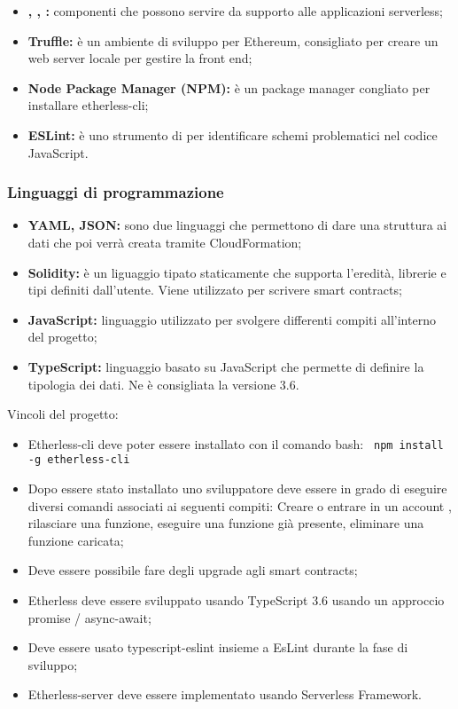 \begin{itemize}
    		 	\item \textbf{, , : }componenti che possono servire da supporto alle applicazioni serverless;
    		 	\item \textbf{Truffle: }è un ambiente di sviluppo per Ethereum, consigliato per creare un web server locale per gestire la front end;
    		 	\item \textbf{Node Package Manager (NPM): }è un package manager congliato per installare etherless-cli;
    			\item \textbf{ESLint: }è uno strumento di  per identificare schemi problematici nel codice JavaScript.
    		 
		\end{itemize}     	
	\subsubsection{Linguaggi di programmazione}
        	\begin{itemize}
        		\item \textbf{YAML, JSON: }sono due linguaggi che permettono di dare una struttura ai dati che poi verrà creata  tramite CloudFormation;
        		\item \textbf{Solidity: }è un liguaggio tipato staticamente che supporta l'eredità, librerie e tipi definiti dall'utente. Viene utilizzato per scrivere smart contracts;	
        		\item \textbf{JavaScript: } linguaggio utilizzato per svolgere differenti compiti all'interno del progetto;
        		\item \textbf{TypeScript: }linguaggio basato su JavaScript che  permette di definire la tipologia dei dati. Ne è consigliata la versione 3.6.
        \end{itemize}
      
    Vincoli del progetto:
    	   \begin{itemize}
    			\item Etherless-cli deve poter essere installato con il comando bash:  
    			\verb! npm install -g etherless-cli!
    	  
    			\item Dopo essere stato installato uno sviluppatore deve essere in grado di eseguire diversi comandi associati ai seguenti compiti: Creare o entrare in un account , rilasciare una funzione, eseguire una funzione già presente, eliminare una funzione caricata;
    			\item Deve essere possibile fare degli upgrade agli smart contracts;
    			\item Etherless deve essere sviluppato usando TypeScript 3.6 usando un approccio  promise / async-await;
    			\item Deve essere usato typescript-eslint insieme a EsLint durante la fase di sviluppo;
    			\item Etherless-server deve essere implementato usando Serverless Framework.
    						
	 \end{itemize}
    
